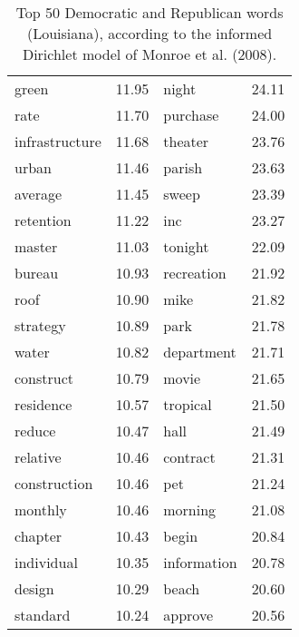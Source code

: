 \begin{table}[ht]
\begin{tabular}{lrlr}
  green & 11.95 & night & 24.11 \\ 
  rate & 11.70 & purchase & 24.00 \\ 
  infrastructure & 11.68 & theater & 23.76 \\ 
  urban & 11.46 & parish & 23.63 \\ 
  average & 11.45 & sweep & 23.39 \\ 
  retention & 11.22 & inc & 23.27 \\ 
  master & 11.03 & tonight & 22.09 \\ 
  bureau & 10.93 & recreation & 21.92 \\ 
  roof & 10.90 & mike & 21.82 \\ 
  strategy & 10.89 & park & 21.78 \\ 
  water & 10.82 & department & 21.71 \\ 
  construct & 10.79 & movie & 21.65 \\ 
  residence & 10.57 & tropical & 21.50 \\ 
  reduce & 10.47 & hall & 21.49 \\ 
  relative & 10.46 & contract & 21.31 \\ 
  construction & 10.46 & pet & 21.24 \\ 
  monthly & 10.46 & morning & 21.08 \\ 
  chapter & 10.43 & begin & 20.84 \\ 
  individual & 10.35 & information & 20.78 \\ 
  design & 10.29 & beach & 20.60 \\ 
  standard & 10.24 & approve & 20.56 \\ 
   \hline
\end{tabular}
\endgroup
\caption{Top 50 Democratic and Republican words (Louisiana), according to the informed Dirichlet model of Monroe et al. (2008).} 
\label{tabFightinLA}
\end{table}

